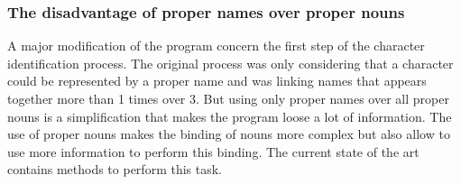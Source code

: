 \documentclass[a4paper, 12pt]{report}
\begin{document}
\subsubsection{The disadvantage of proper names over proper nouns}
A major modification of the program concern the first step of the character identification process. The original process was only considering that a character could be represented by a proper name and was linking names that appears together more than 1 times over 3. But using only proper names over all proper nouns is a simplification that makes the program loose a lot of information. The use of proper nouns makes the binding of nouns more complex but also allow to use more information to perform this binding. The current state of the art contains methods to perform this task. \\

\begin{table}
\center
{}\\
\caption{Different type of characters appearance}\label{properNounsNames}
\end{table}
\end{document}
